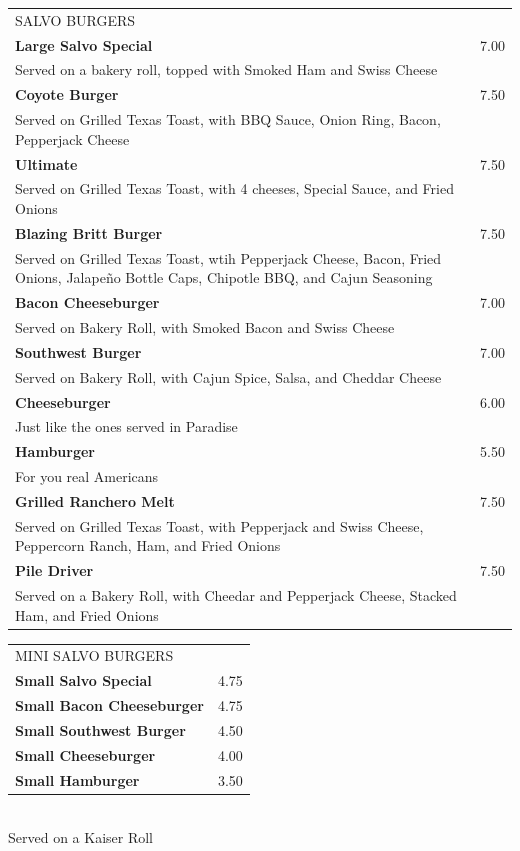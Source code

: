 \documentclass[10pt,notitlepage]{article}
\makeatletter
\newcommand*\ColText[1]{\uppercase{#1}}
\newenvironment{Group}[1]
	{\noindent\begin{tabular*}{\textwidth}{@{}p{.8\linewidth}@{\extracolsep{\fill}}r@{}}
		{\fontsize{16}{20}\selectfont\ColText{#1}}\\[0.8em]}
	{\end{tabular*}}
\newcommand*\Item[2]{%
	\sffamily\textbf{#1}\dotfill & #2}
\newcommand*\Desc[1]{%
	\sffamily\hspace*{1em}\small #1}
\makeatother
\begin{document}
\thispagestyle{first}
	
	\begin{Group}{Salvo Burgers}
		\Item{Large Salvo Special}{7.00} \\
		\Desc{Served on a bakery roll, topped with Smoked Ham and Swiss Cheese} \\
		\Item{Coyote Burger}{7.50} \\
		\Desc{Served on Grilled Texas Toast, with BBQ Sauce, Onion Ring, Bacon, Pepperjack Cheese} \\
		\Item{Ultimate}{7.50} \\
		\Desc{Served on Grilled Texas Toast, with 4 cheeses, Special Sauce, and Fried Onions} \\
		\Item{Blazing Britt Burger}{7.50} \\
		\Desc{Served on Grilled Texas Toast, wtih Pepperjack Cheese, Bacon, Fried Onions, Jalape\~{n}o Bottle Caps, Chipotle BBQ, and Cajun Seasoning} \\
		\Item{Bacon Cheeseburger}{7.00} \\
		\Desc{Served on Bakery Roll, with Smoked Bacon and Swiss Cheese} \\
		\Item{Southwest Burger}{7.00} \\
		\Desc{Served on Bakery Roll, with Cajun Spice, Salsa, and Cheddar Cheese} \\
		\Item{Cheeseburger}{6.00} \\
		\Desc{Just like the ones served in Paradise} \\
		\Item{Hamburger}{5.50} \\
		\Desc{For you real Americans} \\
		\Item{Grilled Ranchero Melt}{7.50} \\
		\Desc{Served on Grilled Texas Toast, with Pepperjack and Swiss Cheese, Peppercorn Ranch, Ham, and Fried Onions} \\
		\Item{Pile Driver}{7.50} \\
		\Desc{Served on a Bakery Roll, with Cheedar and Pepperjack Cheese, Stacked Ham, and Fried Onions} \\
	\end{Group}
	
	\vfill{}
	
	\begin{Group}{Mini Salvo Burgers}
		\Item{Small Salvo Special}{4.75} \\
		\Item{Small Bacon Cheeseburger}{4.75} \\
		\Item{Small Southwest Burger}{4.50} \\
		\Item{Small Cheeseburger}{4.00} \\
		\Item{Small Hamburger}{3.50} \\
	\end{Group}
	\\[\baselineskip]
	\centering Served on a Kaiser Roll \\
	
\end{document}

